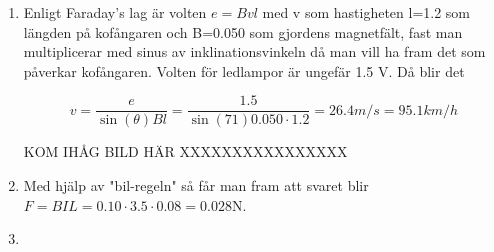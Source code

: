 \documentclass[a4paper,12pt]{article}
\begin{document}
\begin{enumerate}
    \item Enligt Faraday's lag är volten $e=Bvl$ med v som hastigheten
    l=1.2 som längden på kofångaren och B=0.050 som gjordens magnetfält,
    fast man multiplicerar med sinus av inklinationsvinkeln då
    man vill ha fram det som påverkar kofångaren. 
    Volten för ledlampor är ungefär 1.5 V. Då blir det

    $$v=\frac{e}{\sin(\theta)Bl}=\frac{1.5}{\sin(71)0.050\cdot 1.2}=26.4m/s=95.1km/h$$

    KOM IHÅG BILD HÄR XXXXXXXXXXXXXXXX
    \item Med hjälp av "bil-regeln" så får man fram att
    svaret blir $F=BIL=0.10\cdot 3.5\cdot 0.08=0.028$N.

    \item 

\end{enumerate}
\end{document}
